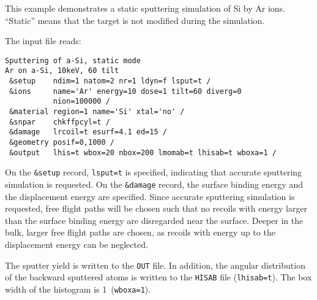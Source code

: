 This example demonstrates a static sputtering simulation of Si by Ar ions.
``Static'' means that the target is not modified during the simulation.

The input file reads:

\begin{verbatim}
Sputtering of a-Si, static mode
Ar on a-Si, 10keV, 60 tilt
 &setup    ndim=1 natom=2 nr=1 ldyn=f lsput=t /
 &ions     name='Ar' energy=10 dose=1 tilt=60 diverg=0
           nion=100000 /
 &material region=1 name='Si' xtal='no' /
 &snpar    chkffpcyl=t /
 &damage   lrcoil=t esurf=4.1 ed=15 /
 &geometry posif=0,1000 /
 &output   lhis=t wbox=20 nbox=200 lmomab=t lhisab=t wboxa=1 /
\end{verbatim}

On the \texttt{\&setup} record, \texttt{lsput=t} is specified, indicating that
accurate sputtering simulation is requested. On the \texttt{\&damage} record,
the surface binding energy and the displacement energy are specified. Since
accurate sputtering simulation is requested, free flight paths will be chosen
such that no recoils with energy larger than the surface binding energy are
disregarded near the surface. Deeper in the bulk, larger free flight paths are
chosen, as recoils with energy up to the displacement energy can be neglected.

The sputter yield is written to the \texttt{OUT} file. In addition, the angular
distribution of the backward sputtered atoms is written to the \texttt{HISAB}
file (\texttt{lhisab=t}). The box width of the histogram is 1\textdegree\
(\texttt{wboxa=1}).

